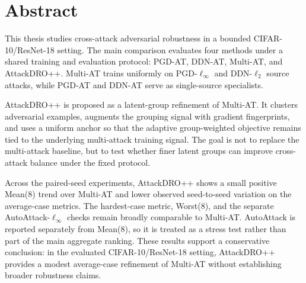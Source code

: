\chapter*{Abstract}

This thesis studies cross-attack adversarial robustness in a bounded
CIFAR-10/ResNet-18 setting. The main comparison evaluates four methods under a
shared training and evaluation protocol: PGD-AT, DDN-AT, Multi-AT, and
AttackDRO++. Multi-AT trains uniformly on PGD-$\ell_\infty$ and DDN-$\ell_2$
source attacks, while PGD-AT and DDN-AT serve as single-source specialists.

\noindent AttackDRO++ is proposed as a latent-group refinement of Multi-AT. It
clusters adversarial examples, augments the grouping signal with gradient
fingerprints, and uses a uniform anchor so that the adaptive group-weighted
objective remains tied to the underlying multi-attack training signal. The goal
is not to replace the multi-attack baseline, but to test whether finer latent
groups can improve cross-attack balance under the fixed protocol.

\noindent Across the paired-seed experiments, AttackDRO++ shows a small positive
Mean(8) trend over Multi-AT and lower observed seed-to-seed variation on the
average-case metrics. The hardest-case metric, Worst(8), and the separate
AutoAttack-$\ell_\infty$ checks remain broadly comparable to Multi-AT.
AutoAttack is reported separately from Mean(8), so it is treated as a stress
test rather than part of the main aggregate ranking. These results support a
conservative conclusion: in the evaluated CIFAR-10/ResNet-18 setting,
AttackDRO++ provides a modest average-case refinement of Multi-AT without
establishing broader robustness claims.
